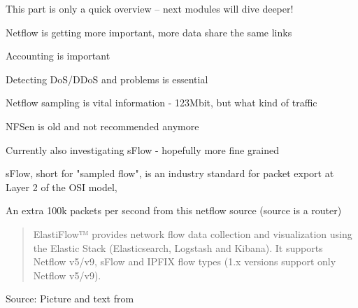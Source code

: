 \documentclass[Screen16to9,17pt]{foils}
\begin{document}



\begin{list2}
\item This part is only a quick overview -- next modules will dive deeper!
\end{list2}



\begin{list2}
\item Netflow is getting more important, more data share the same links
\item Accounting is important
\item Detecting DoS/DDoS and problems is essential
\item Netflow sampling is vital information - 123Mbit, but what kind of traffic
\item NFSen is old and not recommended anymore
\item Currently also investigating sFlow - hopefully more fine grained
\item sFlow, short for "sampled flow", is an industry standard for packet export at Layer 2 of the OSI model, \\
\end{list2}









\centerline{An extra 100k packets per second from this netflow source (source is a router)}





\begin{quote}
  ElastiFlow™ provides network flow data collection and visualization using the Elastic Stack (Elasticsearch, Logstash and Kibana). It supports Netflow v5/v9, sFlow and IPFIX flow types (1.x versions support only Netflow v5/v9).
\end{quote}
Source: Picture and text from  \\
\end{document}
